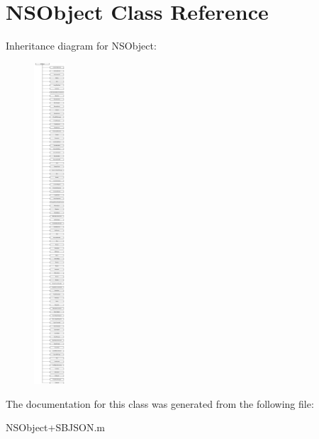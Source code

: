 \hypertarget{class_n_s_object}{
\section{\-N\-S\-Object \-Class \-Reference}
\label{class_n_s_object}
}
\-Inheritance diagram for \-N\-S\-Object\-:\begin{figure}[H]
\begin{center}
\leavevmode
\includegraphics[height=12.000000cm]{class_n_s_object}
\end{center}
\end{figure}


\-The documentation for this class was generated from the following file\-:\begin{DoxyCompactItemize}
\item 
\-N\-S\-Object+\-S\-B\-J\-S\-O\-N.\-m\end{DoxyCompactItemize}
